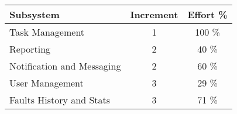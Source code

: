 
\begin{tabular}{l|c|c}
\textbf{Subsystem} & \textbf{Increment} & \textbf{Effort \%}  \\ \hline
Task Management & 1 & 100 \% \\
Reporting & 2 & 40 \% \\
Notification and Messaging & 2 & 60 \% \\
User Management & 3 & 29 \% \\
Faults History and Stats & 3 & 71 \% \\
\end{tabular}
